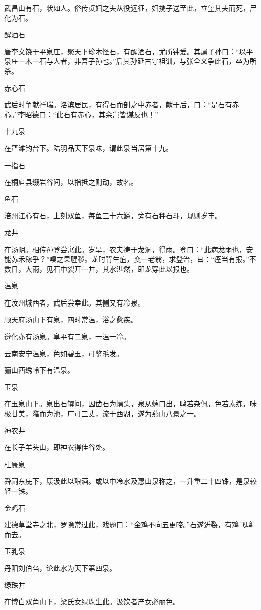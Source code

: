 \documentclass[a4paper,12pt,UTF8,twoside]{ctexbook}
\begin{document}
武昌山有石，状如人。俗传贞妇之夫从役远征，妇携子送至此，立望其夫而死，尸化为石。

醒酒石

唐李文饶于平泉庄，聚天下珍木怪石，有醒酒石，尤所钟爱。其属子孙曰：“以平泉庄一木一石与人者，非吾子孙也。”后其孙延古守祖训，与张全义争此石，卒为所杀。

赤心石

武后时争献祥瑞。洛滨居民，有得石而剖之中赤者，献于后，曰：“是石有赤心。”李昭德曰：“此石有赤心，其余岂皆谋反也！”

十九泉

在严滩钓台下。陆羽品天下泉味，谓此泉当居第十九。

一指石

在桐庐县缀岩谷间，以指抵之则动，故名。

鱼石

涪州江心有石，上刻双鱼，每鱼三十六鳞，旁有石秤石斗，现则岁丰。

龙井

在汤阴。相传孙登尝寓此。岁旱，农夫祷于龙洞，得雨。登曰：“此病龙雨也，安能苏禾稼乎？”嗅之果腥秽。龙时背生疽，变一老翁，求登治，曰：“痊当有报。”不数日，大雨，见石中裂开一井，其水湛然，即龙穿此以报也。

温泉

在汝州城西者，武后尝幸此。其侧又有冷泉。

顺天府汤山下有泉，四时常温，浴之愈疾。

遵化亦有汤泉。阜平有二泉，一温一冷。

云南安宁温泉，色如碧玉，可鉴毛发。

骊山西绣岭下有温泉。

玉泉

在玉泉山下。泉出石罅间，因凿石为螭头，泉从螭口出，鸣若杂佩，色若素练，味极甘美，潴而为池，广可三丈，流于西湖，遂为燕山八景之一。

神农井

在长子羊头山，即神农得佳谷处。

杜康泉

舜祠东庑下，康汲此以酿酒。或以中冷水及惠山泉称之，一升重二十四铢，是泉较轻一铢。

金鸡石

建德草堂寺之北，罗隐常过此，戏题曰：“金鸡不向五更啼。”石遂迸裂，有鸡飞鸣而去。

玉乳泉

丹阳刘伯刍，论此水为天下第四泉。

绿珠井

在博白双角山下，梁氏女绿珠生此。汲饮者产女必丽色。
\end{document}
